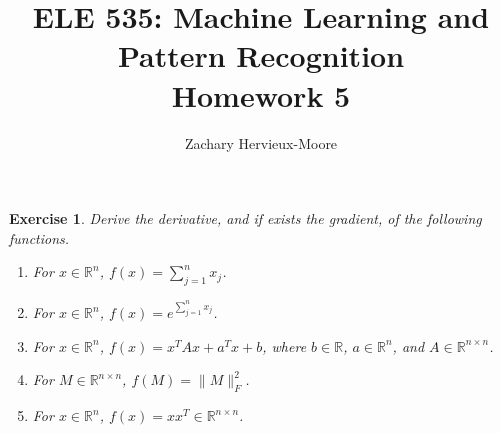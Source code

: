 \documentclass[12pt]{article}
\title{ELE 535: Machine Learning and Pattern Recognition \\ Homework 5}
\author{Zachary Hervieux-Moore}
\date{\displaydate{date}}
\theoremstyle{colon}
\newtheorem{exercise}{Exercise}
\begin{document}
\maketitle

\clearpage

\begin{exercise}
  Derive the derivative, and if exists the gradient, of the following functions.

  \begin{enumerate}[label=\alph*)]
    \item For $x \in \mathbb{R}^n$, $f(x) = \sum_{j=1}^n x_j$.
    \item For $x \in \mathbb{R}^n$, $f(x) = e^{\sum_{j=1}^n x_j}$.
    \item For $x \in \mathbb{R}^n$, $f(x) = x^T A x + a^T x + b$, where $b \in \mathbb{R}$, $a \in \mathbb{R}^n$, and $A \in \mathbb{R}^{n \times n}$.
    \item For $M \in \mathbb{R}^{n \times n}$, $f(M) = \lVert M \rVert_F^2$.
    \item For $x \in \mathbb{R}^n$, $f(x) = x x^T \in \mathbb{R}^{n \times n}$.
  \end{enumerate}
\end{exercise}
\end{document}

